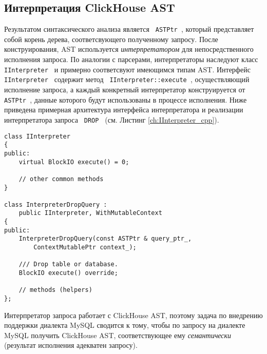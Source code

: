 \subsection{Интерпретация ClickHouse AST}
Результатом синтаксического анализа является \texttt{ ASTPtr }, который представляет собой корень дерева, соответсвующего полученному запросу. После конструирования, AST используется \textit{интерпретатором} для непосредственного исполнения запроса. По аналогии с парсерами, интерпретаторы наследуют класс \texttt{ IInterpreter } и примерно соответсвуют имеющимся типам AST. Интерфейс \texttt{ IInterpreter } содержит метод \texttt{ IInterpreter::execute }, осуществляющий исполнение запроса, а каждый конкретный интерпретатор конструируется от \texttt{ ASTPtr }, данные которого будут использованы в процессе исполнения. Ниже приведена примерная архитектура интерфейса интерпретатора и реализации интерпретатора запроса \texttt{ DROP } (см. Листинг \ref{ch:IInterpreter_cpp}).
\begin{code}
    \label{ch:IInterpreter_cpp}
    \begin{verbatim}
class IInterpreter
{
public:
    virtual BlockIO execute() = 0;
    
    // other common methods
}

class InterpreterDropQuery : 
    public IInterpreter, WithMutableContext
{
public:
    InterpreterDropQuery(const ASTPtr & query_ptr_, 
        ContextMutablePtr context_);
    
    /// Drop table or database.
    BlockIO execute() override;

    // methods (helpers)
};
    \end{verbatim}
\end{code}

Интерпретатор запроса работает с ClickHouse AST, поэтому задача по внедрению поддержки диалекта MySQL сводится к тому, чтобы по запросу на диалекте MySQL получить ClickHouse AST, соответствующее ему \textit{семантически} (результат исполнения адекватен запросу). 
\pagebreak
